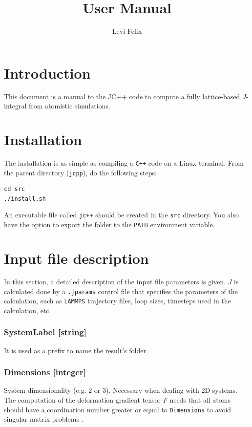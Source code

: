 \documentclass{ol-softwaremanual}
\title{User Manual}
\author{Levi Felix}
\begin{document}
\maketitle

\tableofcontents
\newpage

\section{Introduction}

This document is a manual to the JC++ code to compute a fully lattice-based $J$-integral from atomistic simulations.

\section{Installation}
The installation is as simple as compiling a \verb|C++| code on a Linux terminal. From the parent directory (\verb|jcpp|), do the following steps:
\begin{verbatim}
cd src
./install.sh
\end{verbatim}
An executable file called \verb|jc++| should be created in the \verb|src| directory. You also have the option to export the folder to the \verb|PATH| environment variable.

\section{Input file description}
In this section, a detailed description of the input file parameters is given. $J$ is calculated done by a \verb|.jparams| control file that specifies the parameters of the calculation, such as \verb|LAMMPS| trajectory files, loop sizes, timesteps used in the calculation, etc.

\subsubsection*{SystemLabel [string]} 
It is used as a prefix to name the result's folder.

\subsubsection*{Dimensions [integer]}
System dimensionality (e.g. 2 or 3). Necessary when dealing with 2D systems. The computation of the deformation gradient tensor $F$ needs that all atoms should have a coordination number greater or equal to \verb|Dimensions| to avoid singular matrix problems \cite{Zimmerman_2009}.
\end{document}

